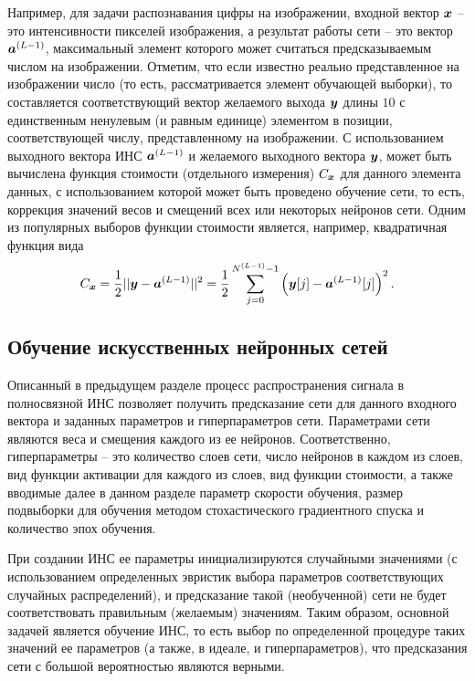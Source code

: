 \documentclass[a4paper,12pt,russian]{article} %
\begin{document}
Например, для задачи распознавания цифры на изображении, входной вектор $\bm{x}$ -- это интенсивности пикселей изображения, а результат работы сети -- это вектор $\bm{a}^{(L-1)}$, максимальный элемент которого может считаться предсказываемым числом на изображении.
Отметим, что если известно реально представленное на изображении число (то есть, рассматривается элемент обучающей выборки), то составляется соответствующий вектор желаемого выхода $\bm{y}$ длины $10$ с единственным ненулевым (и равным единице) элементом в позиции, соответствующей числу, представленному на изображении.
С использованием выходного вектора ИНС $\bm{a}^{(L-1)}$ и желаемого выходного вектора $\bm{y}$, может быть вычислена функция стоимости (отдельного измерения) $C_{\bm{x}}$ для данного элемента данных, с использованием которой может быть проведено обучение сети, то есть, коррекция значений весов и смещений всех или некоторых нейронов сети.
Одним из популярных выборов функции стоимости является, например, квадратичная функция вида
\begin{equation} \label{ss:review_nn_def_C_quad}
	C_{\bm{x}} = 
		\frac{1}{2} || \bm{y} - \bm{a}^{(L-1)} ||^2 =
		\frac{1}{2} \sum_{j=0}^{N^{(L-1)}-1} \left( \bm{y}[j] - \bm{a}^{(L-1)}[j] \right)^2.
\end{equation}

\newpage
\subsection{Обучение искусственных нейронных сетей} \label{ss:review_nnlearning}

Описанный в предыдущем разделе процесс распространения сигнала в полносвязной ИНС позволяет получить предсказание сети для данного входного вектора и заданных параметров и гиперпараметров сети.
Параметрами сети являются веса и смещения каждого из ее нейронов.
Соответственно, гиперпараметры -- это количество слоев сети, число нейронов в каждом из слоев, вид функции активации для каждого из слоев, вид функции стоимости, а также вводимые далее в данном разделе параметр скорости обучения,  размер подвыборки для обучения методом стохастического градиентного спуска и количество эпох обучения.

При создании ИНС ее параметры инициализируются случайными значениями (с использованием определенных эвристик выбора параметров соответствующих случайных распределений), и предсказание такой (необученной) сети не будет соответствовать правильным (желаемым) значениям.
Таким образом, основной задачей является обучение ИНС, то есть выбор по определенной процедуре таких значений ее параметров (а также, в идеале, и гиперпараметров), что предсказания сети с большой вероятностью являются верными.
\end{document}

